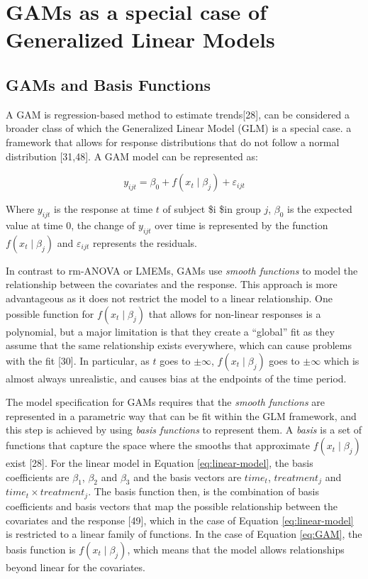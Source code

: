 \documentclass[
]{article}
\begin{document}
\hypertarget{gams-as-a-special-case-of-generalized-linear-models}{%
\section{GAMs as a special case of Generalized Linear Models}\label{gams-as-a-special-case-of-generalized-linear-models}}

\hypertarget{gams-and-basis-functions}{%
\subsection{GAMs and Basis Functions}\label{gams-and-basis-functions}}

A GAM is regression-based method to estimate trends{[}28{]}, can be considered a broader class of which the Generalized Linear Model (GLM) is a special case. a framework that allows for response distributions that do not follow a normal distribution {[}31,48{]}. A GAM model can be represented as:

\begin{equation}
  y_{ijt}=\beta_0+f(x_t\mid \beta_j)+\varepsilon_{ijt}
  \label{eq:GAM}
\end{equation}

Where \(y_{ijt}\) is the response at time \(t\) of subject \$i \$in group \(j\), \(\beta_0\) is the expected value at time 0, the change of \(y_{ijt}\) over time is represented by the function \(f(x_t\mid \beta_j)\) and \(\varepsilon_{ijt}\) represents the residuals.

In contrast to rm-ANOVA or LMEMs, GAMs use \emph{smooth functions} to model the relationship between the covariates and the response. This approach is more advantageous as it does not restrict the model to a linear relationship. One possible function for \(f(x_t\mid \beta_j)\) that allows for non-linear responses is a polynomial, but a major limitation is that they create a ``global'' fit as they assume that the same relationship exists everywhere, which can cause problems with the fit {[}30{]}. In particular, as \(t\) goes to \(\pm \infty\), \(f(x_t \mid \beta_j)\) goes to \(\pm \infty\) which is almost always unrealistic, and causes bias at the endpoints of the time period.

The model specification for GAMs requires that the \emph{smooth functions} are represented in a parametric way that can be fit within the GLM framework, and this step is achieved by using \emph{basis functions} to represent them. A \emph{basis} is a set of functions that capture the space where the smooths that approximate \(f(x_t \mid \beta_j)\) exist {[}28{]}. For the linear model in Equation \eqref{eq:linear-model}, the basis coefficients are \(\beta_1\), \(\beta_2\) and \(\beta_3\) and the basis vectors are \(time_t\), \(treatment_j\) and \(time_t \times treatment_j\). The basis function then, is the combination of basis coefficients and basis vectors that map the possible relationship between the covariates and the response {[}49{]}, which in the case of Equation \eqref{eq:linear-model} is restricted to a linear family of functions. In the case of Equation \eqref{eq:GAM}, the basis function is \(f(x_t\mid \beta_j)\), which means that the model allows relationships beyond linear for the covariates.
\end{document}
